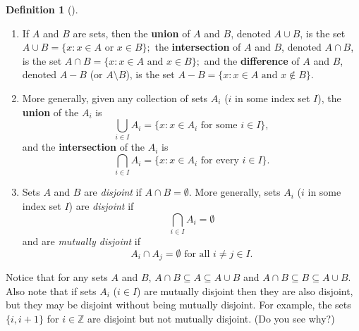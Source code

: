 \documentclass[10pt,]{book}
\newcommand{\terminology}[1]{\textbf{#1}}
\theoremstyle{plain}
\theoremstyle{definition}
\newtheorem{definition}[theorem]{Definition}
\theoremstyle{definition}
\theoremstyle{definition}
\theoremstyle{definition}
\numberwithin{equation}{section}
\def\Z{\mathbb{Z}}
\begin{document}
\begin{definition}[{}]\label{definition-6}
\leavevmode%
\begin{enumerate}
\item\hypertarget{li-6}{}
            If \(A\) and \(B\) are sets, then the \terminology{union} of \(A\) and \(B\), denoted \(A\cup B\), is the set
            \(A\cup B=\{x: x\in A \text{ or }  x\in B\};\) the \terminology{intersection} of \(A\) and \(B\), denoted \(A\cap B\), is the set
            \(A\cap B=\{x: x\in A \text{ and }  x\in B\};\) and the \terminology{difference} of \(A\) and \(B\), denoted \(A-B\) (or \(A\setminus B\)), is the set
            \(A-B=\{x: x\in A \text{ and }  x\not\in B\}.\)
\item\hypertarget{li-7}{}
            More generally, given any collection of sets \(A_i\) (\(i\) in some index set \(I\)), the \terminology{union} of the \(A_i\) is %
\begin{equation*}
\bigcup_{i\in I}A_i=\{x: x\in A_i \text{ for some }  i\in I\},
\end{equation*}
 and the \terminology{intersection} of the \(A_i\) is %
\begin{equation*}
\bigcap_{i\in I}A_i=\{x: x\in A_i \text{ for every }  i\in I\}.
\end{equation*}

\item\hypertarget{li-8}{}
            Sets \(A\) and \(B\) are \emph{disjoint} if \(A\cap B=\emptyset\).  More generally, sets \(A_i\) (\(i\) in some index set \(I\)) are
            \emph{disjoint} if %
\begin{equation*}
\bigcap_{i\in I}A_i=\emptyset
\end{equation*}
 and are \emph{mutually disjoint} if%
\begin{equation*}
A_i\cap A_j=\emptyset \text{ for all } i\neq j \in I. 
\end{equation*}

\end{enumerate}
\label{notation-17}
\label{notation-18}
\label{notation-19}
\label{notation-20}
\label{notation-21}
\end{definition}
\par

    Notice that for any sets \(A\) and \(B\), \(A\cap B \subseteq A \subseteq A\cup B\) and
    \(A\cap B \subseteq B \subseteq A\cup B\). Also note that if sets \(A_i\) (\(i \in I\)) are mutually disjoint then they are also disjoint, but they may be disjoint without being mutually disjoint. For example, the sets \(\{i, i+1\}\) for \(i\in \Z\) are disjoint but not mutually disjoint. (Do you see why?)
\par
\end{document}
